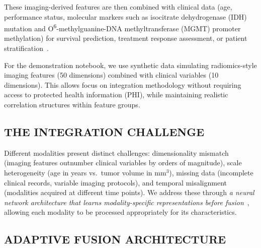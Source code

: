 \documentclass[krantz2,ChapterTOCs]{krantz}
\begin{document}
These imaging-derived features are then combined with clinical data (age, performance status, molecular markers such as isocitrate dehydrogenase (IDH) mutation and O\textsuperscript{6}-methylguanine-DNA methyltransferase (MGMT) promoter methylation) for survival prediction, treatment response assessment, or patient stratification~\citep{truhn2024oncology}.

For the demonstration notebook, we use synthetic data simulating radiomics-style imaging features (50 dimensions) combined with clinical variables (10 dimensions). 
This allows focus on integration methodology without requiring access to protected health information (PHI), while maintaining realistic correlation structures within feature groups.

\subsection{THE INTEGRATION CHALLENGE}

Different modalities present distinct challenges: dimensionality mismatch (imaging features outnumber clinical variables by orders of magnitude), scale heterogeneity (age in years vs.\ tumor volume in mm$^3$), missing data (incomplete clinical records, variable imaging protocols), and temporal misalignment (modalities acquired at different time points). We address these through \emph{a neural network architecture that learns modality-specific representations before fusion}~\citep{xu2023multimodal}, allowing each modality to be processed appropriately for its characteristics.

\subsection{ADAPTIVE FUSION ARCHITECTURE}
\end{document}
